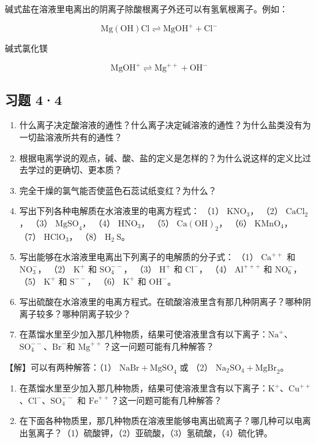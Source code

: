 碱式盐在溶液里电离出的阴离子除酸根离子外还可以有氢氧根离子。例如：

\[
\mathrm{Mg} (\mathrm{OH}) \mathrm{Cl} \rightleftharpoons \mathrm{MgOH} ^ {+} + \mathrm{Cl} ^ {-}
\]

碱式氯化镁

\[
\mathrm{MgOH} ^ {+} \rightleftharpoons \mathrm{Mg} ^ {+ +} + \mathrm{OH} ^ {-}
\]

\subsection{习题 4·4}

\begin{enumerate}
\item
  什么离子决定酸溶液的通性？什么离子决定碱溶液的通性？为什么盐类没有为一切盐溶液所共有的通性？
\item
  根据电离学说的观点，碱、酸、盐的定义是怎样的？为什么说这样的定义比过去学过的更确切、更本质？
\item
  完全干燥的氯气能否使蓝色石蕊试纸变红？为什么？
\item
  写出下列各种电解质在水溶液里的电离方程式： （1）
  \(\mathrm{KNO}_{3}\)， （2） \(\mathrm{CaCl}_{2}\)， （3）
  \(\mathrm{MgSO}_{4}\)， （4） \(\mathrm{HNO}_{3}\)， （5）
  \(\mathrm{Ca(OH)}_{2}\)， （6） \(\mathrm{KMnO}_{4}\)， （7）
  \(\mathrm{HClO}_{3}\)， （8） \(\mathrm{H}_{2} \mathrm{~S}\)。
\item
  写出能够在水溶液里电离出下列离子的电解质的分子式： （1）
  \(\mathrm{Ca}^{++}\) 和 \(\mathrm{NO}_3^-\)， （2） \(\mathrm{K}^+\)
  和 \(\mathrm{SO}_4^{--}\)， （3） \(\mathrm{H}^+\) 和
  \(\mathrm{Cl}^-\)， （4） \(\mathrm{Al}^{+++}\) 和
  \(\mathrm{NO}_6^-\)， （5） \(\mathrm{K}^+\) 和 \(\mathrm{S}^{--}\)，
  （6） \(\mathrm{K}^+\) 和 \(\mathrm{OH}^-\)。
\item
  写出硫酸在水溶液里的电离方程式。在硫酸溶液里含有那几种阴离子？哪种阴离子较多？哪种阴离子较少？
\item
  在蒸馏水里至少加入那几种物质，结果可使溶液里含有以下离子：\(\mathrm{Na}^{+}\)、\(\mathrm{SO}_{4}^{--}\)、\(\mathrm{Br}^{-}\)和
  \(\mathrm{Mg}^{++}\)？这一问题可能有几种解答？
\end{enumerate}

【解】可以有两种解答：（1） \(\mathrm{NaBr} + \mathrm{MgSO}_4\) 或 （2）
\(\mathrm{Na}_2\mathrm{SO}_4 + \mathrm{MgBr}_2\)。

\begin{enumerate}[start=8]
\item
  在蒸馏水里至少加入那几种物质，结果可使溶液里含有以下离子：\(\mathrm{K}^{+}\)、\(\mathrm{Cu}^{++}\)、\(\mathrm{Cl}^{-}\)、\(\mathrm{SO}_{4}^{--}\)
  和 \(\mathrm{Fe}^{++}\)？这一问题可能有几种解答？
\item
  在下面各种物质里，那几种物质在溶液里能够电离出硫离子？哪几种可以电离出氢离子？（1）硫酸钾，（2）亚硫酸，（3）氢硫酸，（4）硫化钾。
\end{enumerate}

